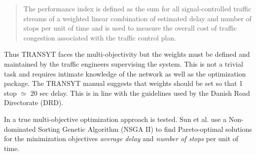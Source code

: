 \begin{quote}
The performance index is defined as the sum for all signal-controlled
traffic streams of a weighted linear combination of estimated delay
and number of stops per unit of time and is used to measure the overall
cost of traffic congestion associated with the traffic control plan.
\end{quote}

Thus TRANSYT faces the multi-objectivity but the weights must be
defined and maintained by the traffic engineers supervising the
system. This is not a trivial task and requires intimate knowledge of
the network as well as the optimization package. The TRANSYT manual
suggests that weights should be set so that 1 stop $\simeq$ 20 sec
delay. This is in line with the guidelines used by the Danish Road
Directorate (DRD).

In \citet{41} a true multi-objective optimization approach is
tested. Sun et al. use a Non-dominated Sorting Genetic Algorithm (NSGA
II) to find Pareto-optimal solutions for the minimization objectives
\textit{average delay} and \textit{number of stops} per unit of time.
